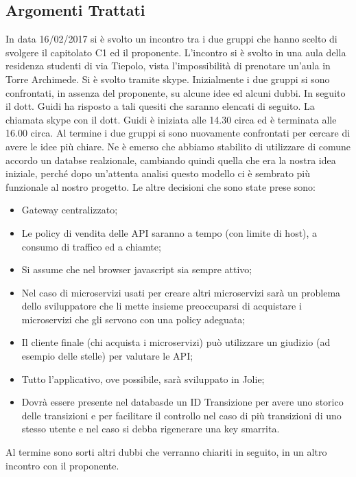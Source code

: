 \documentclass[12pt,a4paper,titlepage]{article}
\begin{document}
\subsection{Argomenti Trattati}
In data 16/02/2017 si è svolto un incontro tra i due gruppi che hanno scelto di svolgere il capitolato C1 ed il proponente. L'incontro si è svolto in una aula della residenza studenti di via Tiepolo, vista l'impossibilità di prenotare un'aula in Torre Archimede.
Si è svolto tramite skype. Inizialmente i due gruppi si sono confrontati, in assenza del proponente, su alcune idee ed alcuni dubbi. In seguito il dott. Guidi ha risposto a tali quesiti che saranno elencati di seguito. La chiamata skype con il dott. Guidi è iniziata alle 14.30 circa ed è terminata alle 16.00 circa. Al termine i due gruppi si sono nuovamente confrontati per cercare di avere le idee più chiare. Ne è emerso che abbiamo stabilito di utilizzare di comune accordo un databse realzionale, cambiando quindi quella che era la nostra idea  iniziale, perché dopo un'attenta analisi questo modello ci è sembrato più funzionale al nostro progetto. Le altre decisioni che sono state prese sono:
\begin{itemize}
	\item Gateway centralizzato;
	\item Le policy di vendita delle API saranno a tempo (con limite di host), a consumo di traffico ed a chiamte;
	\item Si assume che nel browser javascript sia sempre attivo;
	\item Nel caso di microservizi usati per creare altri microservizi sarà un problema dello sviluppatore che li mette insieme preoccuparsi di acquistare i microservizi che gli servono con una policy adeguata;
	\item Il cliente finale (chi acquista i microservizi) può utilizzare un giudizio (ad esempio delle stelle) per valutare le API;
	\item Tutto l'applicativo, ove possibile, sarà sviluppato in Jolie;
	\item Dovrà essere presente nel databasde un ID Transizione per avere uno storico delle transizioni e per facilitare il controllo nel caso di più transizioni di uno stesso utente e nel caso si debba rigenerare una key smarrita.
\end{itemize}
Al termine sono sorti altri dubbi che verranno chiariti in seguito, in un altro incontro con il proponente.
\end{document}
